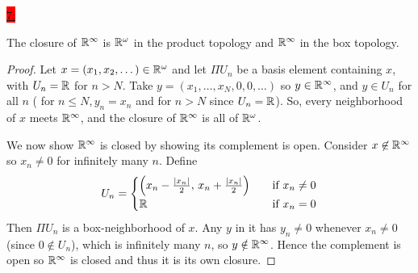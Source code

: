 \documentclass{exam}
\begin{document}
\colorbox{red}{\underline{7:}}
\begin{solution}
    The closure of $\mathbb R^{\infty}$ is $\mathbb R^{\omega}$ in the product topology and $\mathbb R^{\infty}$ in the box topology. 
    \begin{proof}
        Let $x= (x_1, x_2, \dots) \in \mathbb R^{\omega}$ and let $\Pi U_n$ be a basis element containing $x$, with $U_n = \mathbb R$ for $n > N$. Take $y = (x_1, \dots, x_N, 0, 0, \dots)$ so $y \in \mathbb R^{\infty}$, and $y \in U_n$ for all $n$ ( for $n \leq N, y_n = x_n$ and for $n > N$ since $U_n = \mathbb R$). So, every neighborhood of $x$ meets $\mathbb R^{\infty}$, and the closure of $\mathbb R^{\infty}$ is all of $\mathbb R^{\omega}$. 

        We now show $\mathbb R^{\infty}$ is closed by showing its complement is open. Consider $x \not\in \mathbb R^{\infty}$ so $x_n \neq 0$ for infinitely many $n$. Define 
        \[
            U_n = \begin{cases}
                \left(x_n - \tfrac{|x_n|}{2},\, x_n + \tfrac{|x_n|}{2}\right) \quad &\text{if } x_n \neq 0 \\
                \mathbb R \quad &\text{if } x_n = 0
            \end{cases} 
        \]
        Then $\Pi U_n$ is a box-neighborhood of $x$. Any $y$ in it has $y_n \neq 0$ whenever $x_n \neq 0$ (since $0 \notin U_n$), which is infinitely many $n$, so $y \notin \mathbb R^{\infty}$. Hence the complement is open so $\mathbb R^{\infty}$ is closed and thus it is its own closure.
    \end{proof}
\end{solution}
\end{document}
